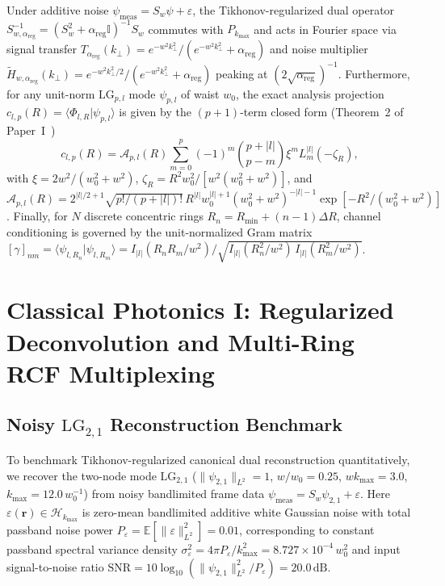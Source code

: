 \documentclass[aps,pra,reprint,nofootinbib,floatfix,longbibliography]{revtex4-2}
\newcommand{\braket}[2]{\langle #1 | #2 \rangle}
\newcommand{\norm}[1]{\lVert #1 \rVert}
\newcommand{\abs}[1]{\lvert #1 \rvert}
\begin{document}
Under additive noise $\psi_{\mathrm{meas}} = S_w\psi + \varepsilon$, the Tikhonov-regularized dual operator $S_{w,\alpha_{\mathrm{reg}}}^{-1} = (S_w^2 + \alpha_{\mathrm{reg}}\mathbb{I})^{-1}S_w$ commutes with $P_{k_{\max}}$ and acts in Fourier space via signal transfer $T_{\alpha_{\mathrm{reg}}}(k_\perp) = e^{-w^2 k_\perp^2}/(e^{-w^2 k_\perp^2}+\alpha_{\mathrm{reg}})$ and noise multiplier $\widetilde{H}_{w,\alpha_{\mathrm{reg}}}(k_\perp) = e^{-w^2 k_\perp^2/2}/(e^{-w^2 k_\perp^2}+\alpha_{\mathrm{reg}})$ peaking at $(2\sqrt{\alpha_{\mathrm{reg}}})^{-1}$. Furthermore, for any unit-norm $\mathrm{LG}_{p,l}$ mode $\psi_{p,l}$ of waist $w_0$, the exact analysis projection $c_{l,p}(R) = \braket{\Phi_{l,R}}{\psi_{p,l}}$ is given by the $(p+1)$-term closed form (Theorem~2 of Paper~I~\cite{AyalaPaperI})
\begin{equation}
c_{l,p}(R) = \mathcal{A}_{p,l}(R) \sum_{m=0}^p (-1)^m \binom{p+\abs{l}}{p-m} \xi^m L_m^{\abs{l}}(-\zeta_R),
\label{eq:c_lp_recap}
\end{equation}
with $\xi = 2w^2/(w_0^2+w^2)$, $\zeta_R = R^2 w_0^2/[w^2(w_0^2+w^2)]$, and $\mathcal{A}_{p,l}(R) = 2^{\abs{l}/2+1}\sqrt{p!/(p+\abs{l})!}\,\allowbreak R^{\abs{l}}w_0^{\abs{l}+1}(w_0^2+w^2)^{-\abs{l}-1}\allowbreak \exp[-R^2/(w_0^2+w^2)]$. Finally, for $N$ discrete concentric rings $R_n = R_{\min} + (n-1)\Delta R$, channel conditioning is governed by the unit-normalized Gram matrix $[\gamma]_{nm} = \braket{\psi_{l,R_n}}{\psi_{l,R_m}} = \allowbreak I_{\abs{l}}(R_n R_m/w^2)/\allowbreak \sqrt{I_{\abs{l}}(R_n^2/w^2)\,I_{\abs{l}}(R_m^2/w^2)}$.

\section{Classical Photonics I: Regularized Deconvolution and Multi-Ring RCF Multiplexing}
\label{sec:classical_sdm}

\subsection{Noisy \texorpdfstring{$\mathrm{LG}_{2,1}$}{LG\_\{2,1\}} Reconstruction Benchmark}
\label{subsec:noisy_lg21}

To benchmark Tikhonov-regularized canonical dual reconstruction quantitatively, we recover the two-node mode $\mathrm{LG}_{2,1}$ ($\norm{\psi_{2,1}}_{L^2} = 1$, $w/w_0 = 0.25$, $w k_{\max} = 3.0$, $k_{\max} = 12.0\,w_0^{-1}$) from noisy bandlimited frame data $\psi_{\mathrm{meas}} = S_w\psi_{2,1} + \varepsilon$. Here $\varepsilon(\mathbf{r}) \in \mathcal{H}_{k_{\max}}$ is zero-mean bandlimited additive white Gaussian noise with total passband noise power $P_\varepsilon = \mathbb{E}[\norm{\varepsilon}_{L^2}^2] = 0.01$, corresponding to constant passband spectral variance density $\sigma_\varepsilon^2 = 4\pi P_\varepsilon/k_{\max}^2 = 8.727\times 10^{-4}\,w_0^2$ and input signal-to-noise ratio $\mathrm{SNR} = 10\log_{10}(\norm{\psi_{2,1}}_{L^2}^2/P_\varepsilon) = 20.0\,\mathrm{dB}$.
\end{document}

